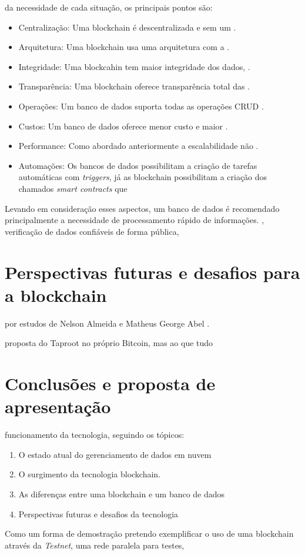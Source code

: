 \documentclass[acronym,symbols]{fei}
\begin{document}
 da necessidade de cada situação, os principais pontos são:

\begin{itemize}
    \item Centralização: Uma blockchain é descentralizada e sem um .
    \item Arquitetura: Uma blockchain usa uma arquitetura com a .
    \item Integridade: Uma blockcahin tem maior integridade dos dados, .
    \item Transparência: Uma blockchain oferece transparência total das .
    \item Operações: Um banco de dados suporta todas as operações CRUD .
    \item Custos: Um banco de dados oferece menor custo e maior .
    \item Performance: Como abordado anteriormente a escalabilidade não .
    \item Automações: Os bancos de dados possibilitam a criação de tarefas automáticas com \textit{triggers}, já as blockchain possibilitam a criação dos chamados \textit{smart contracts} que     
\end{itemize}

Levando em consideração esses aspectos, um banco de dados é recomendado  principalmente a necessidade de processamento rápido de informações.
 \cite{btcRadio}, verificação de dados confiáveis de forma pública,


\chapter{Perspectivas futuras e desafios para a blockchain}

 por estudos de Nelson Almeida \cite{redeHibridaMeshComLora} e Matheus George Abel \cite{topologiaMeshComLora}.

 proposta do Taproot \cite{taproot} no próprio Bitcoin, mas ao que tudo 

\chapter{Conclusões e proposta de apresentação}
 funcionamento da tecnologia, seguindo os tópicos:

\begin{enumerate}
    \item O estado atual do gerenciamento de dados em nuvem
    \item O surgimento da tecnologia blockchain.
    \item As diferenças entre uma blockchain e um banco de dados
    \item Perspectivas futuras e desafios da tecnologia
\end{enumerate}

Como um forma de demostração pretendo exemplificar o uso de uma blockchain através da \textit{Testnet}, uma rede paralela para testes, 

\printbibliography
\end{document}

